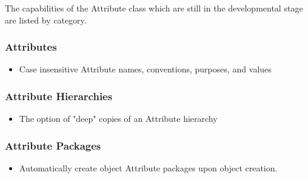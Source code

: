 %

The capabilities of the Attribute class which are still in the developmental stage are listed by category.
 
\subsubsection{Attributes}

\begin{itemize}
\item Case insensitive Attribute names, conventions, purposes, and values
\end{itemize}

\subsubsection{Attribute Hierarchies}

\begin{itemize}
\item The option of "deep" copies of an Attribute hierarchy
\end{itemize}

\subsubsection{Attribute Packages}

\begin{itemize}
\item Automatically create object Attribute packages upon object creation.
\end{itemize}
